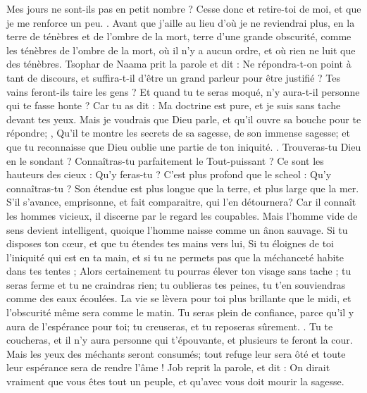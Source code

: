 \begin{multicols}{2}
Mes jours ne sont-ils pas en petit nombre ? Cesse donc et retire-toi de moi, et que je me renforce un peu. .
Avant que j'aille au lieu d'où je ne reviendrai plus, en la terre de ténèbres et de l'ombre de la mort,
terre d'une grande obscurité, comme les ténèbres de l'ombre de la mort, où il n'y a aucun ordre, et où rien ne luit que des ténèbres. 
\VerseOne{}Tsophar de Naama prit la parole et dit :
Ne répondra-t-on point à tant de discours, et suffira-t-il d'être un grand parleur pour être justifié ?
Tes vains feront-ils taire les gens ? Et quand tu te seras moqué, n'y aura-t-il personne qui te fasse honte ?
Car tu as dit : Ma doctrine est pure, et je suis sans tache devant tes yeux. 
Mais je voudrais que Dieu parle, et qu'il ouvre sa bouche pour te répondre; ,
Qu'il te montre les secrets de sa sagesse, de son immense sagesse; et que tu reconnaisse que Dieu oublie une partie de ton iniquité. .
Trouveras-tu Dieu en le sondant ? Connaîtras-tu parfaitement le Tout-puissant ? 
Ce sont les hauteurs des cieux : Qu'y feras-tu ? C'est plus profond que le scheol : Qu'y connaîtras-tu ?
Son étendue est plus longue que la terre, et plus large que la mer.
S'il s'avance, emprisonne, et fait comparaitre, qui l'en détournera?
Car il connaît les hommes vicieux, il discerne par le regard les coupables.
Mais l'homme vide de sens devient intelligent, quoique l'homme naisse comme un ânon sauvage.
Si tu disposes ton cœur, et que tu étendes tes mains vers lui,
Si tu éloignes de toi l'iniquité qui est en ta main, et si tu ne permets pas que la méchanceté habite dans tes tentes ; 
Alors certainement tu pourras élever ton visage sans tache ; tu seras ferme et tu ne craindras rien;
tu oublieras tes peines, tu t'en souviendras comme des eaux écoulées.
La vie se lèvera pour toi plus brillante que le midi, et l'obscurité même sera comme le matin.
 Tu seras plein de confiance, parce qu'il y aura de l'espérance pour toi; tu creuseras, et tu reposeras sûrement. .
Tu te coucheras, et il n'y aura personne qui t'épouvante, et plusieurs te feront la cour. 
Mais les yeux des méchants seront consumés; tout refuge leur sera ôté et toute leur espérance sera de rendre l'âme !
\VerseOne{}Job reprit la parole, et dit :
On dirait vraiment que vous êtes tout un peuple, et qu'avec vous doit mourir la sagesse.

\end{multicols}

